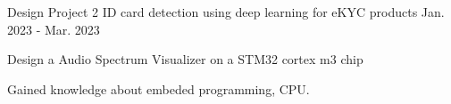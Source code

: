 \begin{cventries}
  \cventry
  {Design Project 2}
  {ID card detection using deep learning for eKYC products}
  {}
  {Jan. 2023 - Mar. 2023}
  {
    \begin{cvitems}
      \item {Design a Audio Spectrum Visualizer on a STM32 cortex m3 chip}
      \item {Gained knowledge about embeded programming, CPU.}
    \end{cvitems}
  }

\end{cventries}
